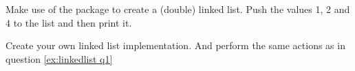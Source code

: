 \begin{Exercise}[title={Linked List},difficulty=1]
\label{ex:linkedlist}
\Question
\label{ex:linkedlist q1}
Make use of the package  to create
a (double) linked list. Push the values 1, 2 and 4 to the list and then
print it.

\Question
Create your own linked list implementation. And perform the same actions
as in question \ref{ex:linkedlist q1}
\end{Exercise}

\begin{Answer}
\Question

\Question
\end{Answer}
